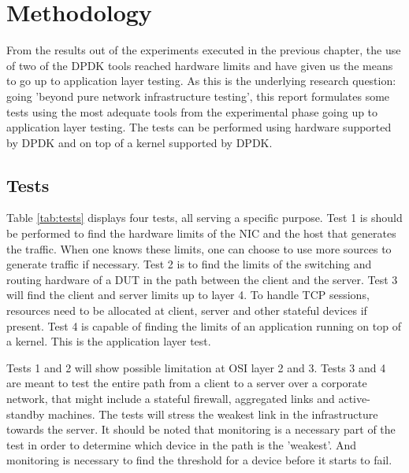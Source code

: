 \chapter{Methodology}\label{ch:method}
From the results out of the experiments executed in the previous chapter, the use of two of the DPDK tools reached hardware limits and have given us the means to go up to application layer testing.  
As this is the underlying research question: going 'beyond pure network infrastructure testing', this report formulates some tests using the most adequate tools from the experimental phase going up to application layer testing.
The tests can be performed using hardware supported by DPDK and on top of a kernel supported by DPDK. 

\section{Tests}\label{sec:tests}

Table \ref{tab:tests} displays four tests, all serving a specific purpose.
Test 1 is should be performed to find the hardware limits of the NIC and the host that generates the traffic. 
When one knows these limits, one can choose to use more sources to generate traffic if necessary.  
Test 2 is to find the limits of the  switching and routing hardware of a DUT in the path between the client and the server.
Test 3 will find the client and server limits up to layer 4. To handle TCP sessions, resources need to be allocated at client, server and other stateful devices if present. 
Test 4 is capable of finding the limits of an application running on top of a kernel. This is the application layer test.  

Tests 1 and 2 will show possible limitation at OSI layer 2 and 3. 
Tests 3 and 4 are meant to test the entire path from a client to a server over a corporate network, that might include a stateful firewall, aggregated links and active-standby machines. The tests will stress the weakest link in the infrastructure towards the server.  
It should be noted that monitoring is a necessary part of the test in order to determine which device in the path is the 'weakest'. 
And monitoring is necessary to find the threshold for a device before it starts to fail. 

